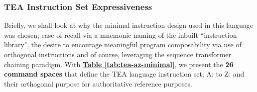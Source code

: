 \documentclass[sigplan,screen]{acmart}
\begin{document}
\subsubsection{TEA Instruction Set Expressiveness}

Briefly, we shall look at why the minimal instruction design used in this language was chosen; ease of recall via a mnemonic naming of the inbuilt ``instruction library", the desire to encourage meaningful program composability via use of orthogonal instructions and of course, leveraging the sequence transformer chaining paradigm. With \textbf{\hyperref[tab:tea-az-minimal]{Table \ref{tab:tea-az-minimal}}}, we present the \textbf{26 command spaces} that define the TEA language instruction set; A: to Z: and their orthogonal purpose for authoritative reference purposes.
\end{document}
